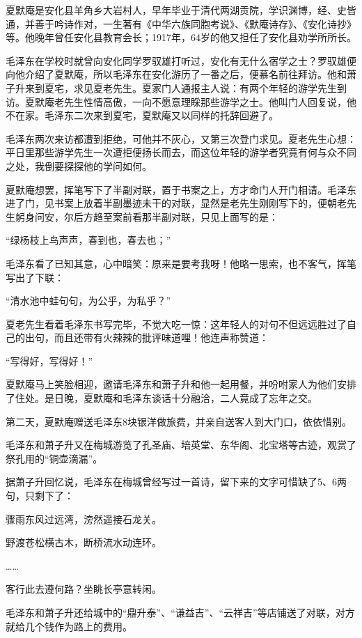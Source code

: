 \documentclass[../../dazhuan.tex]{subfiles}
\begin{document}
夏默庵是安化县羊角乡大岩村人，早年毕业于清代两湖贡院，学识渊博，经、史皆通，并善于吟诗作对，一生著有《中华六族同胞考说》、《默庵诗存》、《安化诗抄》等。他晚年曾任安化县教育会长；1917年，64岁的他又担任了安化县劝学所所长。

毛泽东在学校时就曾向安化同学罗驭雄打听过，安化有无什么宿学之士？罗驭雄便向他介绍了夏默庵，所以毛泽东在安化游历了一番之后，便慕名前往拜访。他和萧子升来到夏宅，求见夏老先生。夏家门人通报主人说：有两个年轻的游学先生到访。夏默庵老先生性情高傲，一向不愿意理睬那些游学之士。他叫门人回复说，他不在家。毛泽东二次来到夏宅，夏默庵又以同样的托辞回避了。

毛泽东两次来访都遭到拒绝，可他并不灰心，又第三次登门求见。夏老先生心想：平日里那些游学先生一次遭拒便扬长而去，而这位年轻的游学者究竟有何与众不同之处，我倒要探探他的学问如何。

夏默庵想罢，挥笔写下了半副对联，置于书案之上，方才命门人开门相请。毛泽东进了门，见书案上放着半副墨迹未干的对联，显然是老先生刚刚写下的，便朝老先生躬身问安，尔后方趋至案前看那半副对联，只见上面写的是：

“绿杨枝上鸟声声，春到也，春去也；”

毛泽东看了已知其意，心中暗笑：原来是要考我呀！他略一思索，也不客气，挥笔写出了下联：

“清水池中蛙句句，为公乎，为私乎？”

夏老先生看着毛泽东书写完毕，不觉大吃一惊：这年轻人的对句不但远远胜过了自己的出句，而且还带有火辣辣的批评味道哩！他连声称赞道：

“写得好，写得好！”

夏默庵马上笑脸相迎，邀请毛泽东和萧子升和他一起用餐，并吩咐家人为他们安排了住处。是日晚，夏默庵和毛泽东谈话十分融洽，二人竟成了忘年之交。

第二天，夏默庵赠送毛泽东8块银洋做旅费，并亲自送客人到大门口，依依惜别。

毛泽东和萧子升又在梅城游览了孔圣庙、培英堂、东华阁、北宝塔等古迹，观赏了祭孔用的“铜壶滴漏”。

据萧子升回忆说，毛泽东在梅城曾经写过一首诗，留下来的文字可惜缺了5、6两句，只剩下了：
\begin{couplet}

骤雨东风过远湾，滂然遥接石龙关。

野渡苍松横古木，断桥流水动连环。

……

客行此去遵何路？坐眺长亭意转闲。
\end{couplet}

毛泽东和萧子升还给城中的“鼎升泰”、“谦益吉”、“云祥吉”等店铺送了对联，对方就给几个钱作为路上的费用。
\end{document}
